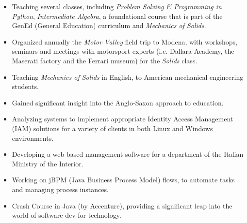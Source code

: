 	\begin{itemize}
		\item Teaching several classes, including \emph{Problem Solving \& Programming in Python}, \emph{Intermediate Algebra}, a foundational course that is part of the GenEd (General Education) curriculum and \emph{Mechanics of Solids}.
		\item Organized annually the \emph{Motor Valley} field trip to Modena, with workshops, seminars and meetings with motorsport experts (i.e. Dallara Academy, the Maserati factory and the Ferrari museum) for the \emph{Solids} class.
	\end{itemize}
	\smallskip
	\medskip

	\begin{itemize}
		\item Teaching \emph{Mechanics of Solids} in English, to American mechanical engineering students.
		\item Gained significant insight into the Anglo-Saxon approach to education.
	\end{itemize}
	\smallskip

	\divider

	\begin{itemize}
		\item Analyzing systems to implement appropriate Identity Access Management (IAM) solutions for a variety of clients in both Linux and Windows environments.
	\end{itemize}

	\divider

	\begin{itemize}
		\item Developing a web-based management software for a department of the Italian Ministry of the Interior.
		\item Working on jBPM (Java Business Process Model) flows, to automate tasks and managing process instances.
	\end{itemize}

	\medskip

	\begin{itemize}
		\item Crash Course in Java (by Accenture), providing a significant leap into the world of software dev for technology.
	\end{itemize}

